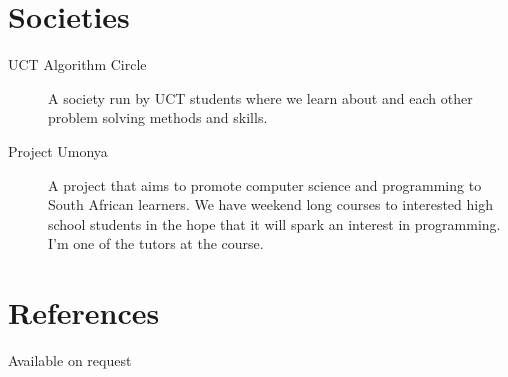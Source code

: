 \documentclass[margin,line,a4paper]{resume}
\begin{document}
\begin{resume}
        \section{\mysidestyle Societies}
            \begin{description}
                \item [UCT Algorithm Circle] A society run by UCT students where we learn about and
                each other problem solving methods and skills.

                \item [Project Umonya] A project that aims to promote computer science and programming
                to South African learners. We have weekend long courses to interested high school students
                in the hope that it will spark an interest in programming. I'm one of the tutors at the course.
            \end{description}

        \section{\mysidestyle References}
            Available on request
    \end{resume}
\end{document}
